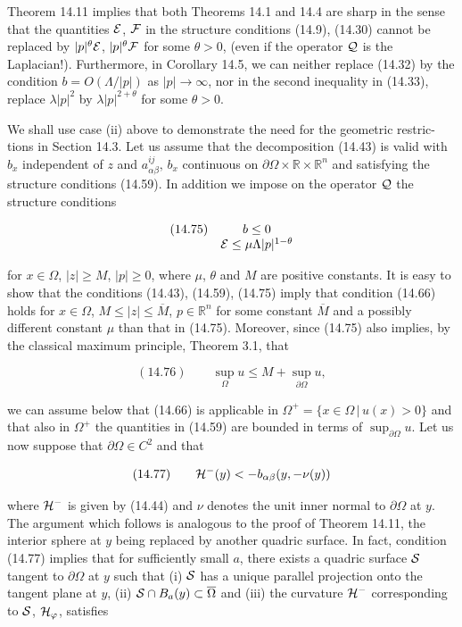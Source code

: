 Theorem 14.11 implies that both Theorems 14.1 and 14.4 are sharp in the sense
that the quantities $\mathcal{E}$, $\mathcal{F}$ in the structure conditions (14.9), (14.30) cannot be
replaced by $|p|^{\theta}\mathcal{E}$, $|p|^{\theta}\mathcal{F}$ for some $\theta>0$, (even if the operator $\mathcal{Q}$ is the Laplacian!).
Furthermore, in Corollary 14.5, we can neither replace (14.32) by the condition
$b=O(\Lambda/|p|)$ as $|p|\to\infty$, nor in the second inequality in (14.33), replace $\lambda|p|^2$ by
$\lambda|p|^{2+\theta}$ for some $\theta>0$.

We shall use case (ii) above to demonstrate the need for the geometric restric-
tions in Section 14.3. Let us assume that the decomposition (14.43) is valid with
$b_x$ independent of $z$ and $a_{\alpha\beta}^{ij},\, b_x$ continuous on $\partial\Omega\times\mathbb{R}\times\mathbb{R}^n$ and satisfying the
structure conditions (14.59). In addition we impose on the operator $\mathcal{Q}$ the structure
conditions

\[
\begin{array}{rcl}
(14.75) & b\le 0 \\
        & \mathcal{E}\le \mu \Lambda |p|^{1-\theta}
\end{array}
\]

for $x\in \Omega$, $|z|\ge M$, $|p|\ge 0$, where $\mu$, $\theta$ and $M$ are positive constants. It is easy to
show that the conditions (14.43), (14.59), (14.75) imply that condition (14.66)
holds for $x\in \Omega$, $M\le |z|\le \overline{M}$, $p\in \mathbb{R}^n$ for some constant $\overline{M}$ and a possibly different
constant $\mu$ than that in (14.75). Moreover, since (14.75) also implies, by the classical
maximum principle, Theorem 3.1, that

\[
(14.76)\qquad \sup_{\Omega} u \le M + \sup_{\partial\Omega} u,
\]

we can assume below that (14.66) is applicable in $\Omega^{+}=\{x\in \Omega\,|\,u(x)>0\}$ and that
also in $\Omega^{+}$ the quantities in (14.59) are bounded in terms of $\sup_{\partial\Omega}u$. Let us now
suppose that $\partial\Omega\in C^2$ and that

\[
(14.77)\qquad \mathcal{H}^{-}(y)<-b_{\alpha\beta}(y,-\nu(y))
\]

where $\mathcal{H}^{-}$ is given by (14.44) and $\nu$ denotes the unit inner normal to $\partial\Omega$ at $y$. The
argument which follows is analogous to the proof of Theorem 14.11, the interior
sphere at $y$ being replaced by another quadric surface. In fact, condition (14.77)
implies that for sufficiently small $a$, there exists a quadric surface $\mathcal{S}$ tangent to $\partial\Omega$
at $y$ such that (i) $\mathcal{S}$ has a unique parallel projection onto the tangent plane at $y$,
(ii) $\mathcal{S}\cap B_a(y)\subset \overline{\Omega}$ and (iii) the curvature $\mathcal{H}^{-}$ corresponding to $\mathcal{S}$, $\mathcal{H}_{\varphi}$, satisfies

